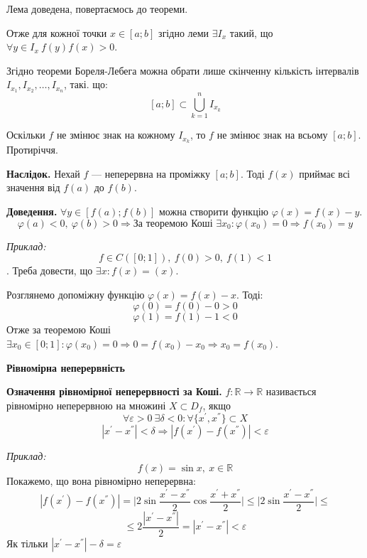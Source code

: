 \documentclass[12pt]{report}
\begin{document}
Лема доведена, повертаємось до теореми.

Отже для кожної точки $x \in [a;b]$ згідно леми $ \exists I_x$ такий, що $\forall y \in I_x\ f(y)f(x) > 0$.

Згідно теореми Бореля-Лебега можна обрати лише скінченну кількість інтервалів $I_{x_1}, I_{x_2}, \ldots, I_{x_n}$, такі. що:
$$[a;b] \subset \bigcup_{k=1}^{n} I_{x_k}$$

Оскільки $f$ не змінює знак на кожному $I_{x_k}$, то $f$ не змінює знак на всьому $[a;b]$. Протиріччя.

\vspace{3mm}

\textbf{Наслідок.} Нехай $f$ --- неперервна на проміжку $[a;b]$. Тоді $f(x)$ приймає всі значення від $f(a)$ до $f(b)$.

\textbf{Доведення.} $\forall y \in [f(a); f(b)]$ можна створити функцію $\varphi (x) = f(x) - y$. 
$$\varphi (a) < 0,\ \varphi(b) > 0 \Longrightarrow \textrm{За теоремою Коші } \exists x_0 : \varphi(x_0) = 0 \Longrightarrow f(x_0) = y$$

\vspace{3mm}

\textit{Приклад:}
$$f \in C([0;1]),\ f(0) > 0,\ f(1) < 1$$.
Треба довести, що $ \exists x : f(x) = (x)$.

Розглянемо допоміжну функцію $\varphi(x) = f(x) - x$. Тоді:
$$\varphi(0) = f(0) - 0 > 0$$
$$\varphi(1) = f(1) - 1 < 0$$
Отже за теоремою Коші $ \exists x_0 \in [0;1] : \varphi(x_0) = 0 \Longrightarrow 0 = f(x_0) - x_0 \Longrightarrow x_0 = f(x_0)$.

\begin{center}
	\textbf{Рівномірна неперервність}
\end{center}

\textbf{Означення рівномірної неперервності за Коші.} $f : \mathbb{R} \to \mathbb{R}$ називається рівномірно неперервною на множині $X \subset D_f$, якщо 
$$\forall \varepsilon > 0 \ \exists \delta < 0 : \forall \{ x^{'}, x^{''}\} \subset X$$
$$|x^{'} - x^{''}| < \delta \Longrightarrow |f(x^{'}) - f(x^{''})| < \varepsilon$$

\textit{Приклад:}
$$f(x) = \sin x,\ x \in \mathbb{R}$$
Покажемо, що вона рівномірно неперервна:
$$|f(x^{'}) - f(x^{''})| = \Big|2 \sin \frac{x^{'} - x^{''}}{2} \cos \frac{x^{'} + x^{''}}{2}\Big| \leq \Big| 2 \sin \frac{x^{'} - x^{''}}{2} \Big| \leq$$
$$\leq 2 \frac{|x^{'} - x^{''}|}{2} = |x^{'} - x^{''}| < \varepsilon$$
Як тільки $|x^{'} - x^{''}| - \delta = \varepsilon$
\end{document}
